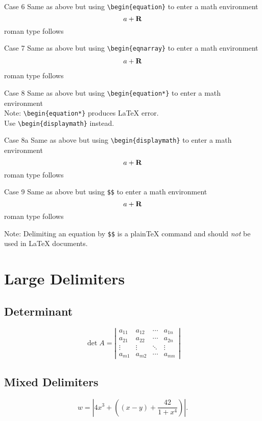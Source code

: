 \documentclass{article}
\begin{document}
Case 6 Same as above but using \verb#\begin{equation}# to enter a math environment
\begin{equation}a+ \bf R\end{equation} roman type follows

Case 7 Same as above but using \verb#\begin{eqnarray}# to enter a math environment
\begin{eqnarray}a+ \bf R\end{eqnarray} roman type follows

Case 8 Same as above but using \verb#\begin{equation*}# to enter a math environment \\
Note: \verb#\begin{equation*}# produces LaTeX error.\\
Use \verb#\begin{displaymath}# instead.

Case 8a Same as above but using \verb#\begin{displaymath}# to enter a math environment
\begin{displaymath}a+ \bf R\end{displaymath} roman type follows

Case 9 Same as above but using \verb#$$# to enter a math environment
$$a+ \bf R$$ roman type follows

Note: Delimiting an equation by \verb|$$| is a plain\TeX{} command and
should \emph{not} be used in \LaTeX{} documents.


\section{Large Delimiters}

\subsection{Determinant}

\[
\det A = \left| \begin{array}{cccc}
a_{11} & a_{12} & \cdots & a_{1n}\\
a_{21} & a_{22} & \cdots & a_{2n}\\
\vdots & \vdots & \ddots & \vdots\\
a_{m1} & a_{m2} & \cdots & a_{mn}
\end{array} \right|
\]

\subsection{Mixed Delimiters}
\[
w =  \left| 4 x^3 + \left( (x-y) + \frac{42}{1+x^4} \right) \right|.
\]
\end{document}
